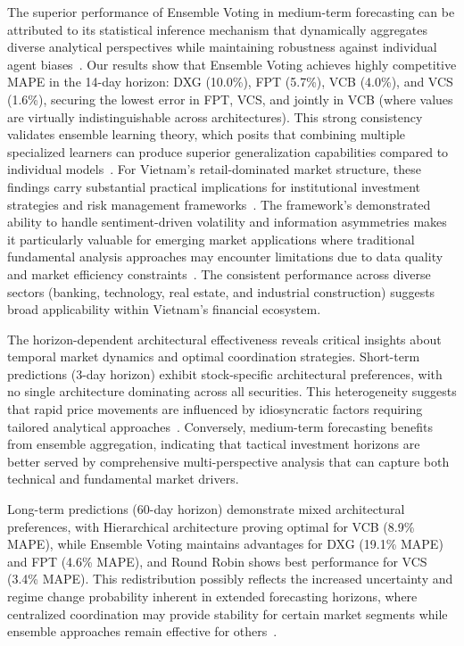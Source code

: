 \documentclass{ieeeaccess}
\begin{document}
The superior performance of Ensemble Voting in medium-term forecasting can be attributed to its statistical inference mechanism that dynamically aggregates diverse analytical perspectives while maintaining robustness against individual agent biases~\cite{zhou2012ensemble,breiman1996bagging}. Our results show that Ensemble Voting achieves highly competitive MAPE in the 14-day horizon: DXG (10.0\%), FPT (5.7\%), VCB (4.0\%), and VCS (1.6\%), securing the lowest error in FPT, VCS, and jointly in VCB (where values are virtually indistinguishable across architectures). This strong consistency validates ensemble learning theory, which posits that combining multiple specialized learners can produce superior generalization capabilities compared to individual models~\cite{dietterich2000ensemble}.
For Vietnam's retail-dominated market structure, these findings carry substantial practical implications for institutional investment strategies and risk management frameworks~\cite{vo2019financial,nguyen2021market}. The framework's demonstrated ability to handle sentiment-driven volatility and information asymmetries makes it particularly valuable for emerging market applications where traditional fundamental analysis approaches may encounter limitations due to data quality and market efficiency constraints~\cite{bekaert2007emerging}. The consistent performance across diverse sectors (banking, technology, real estate, and industrial construction) suggests broad applicability within Vietnam's financial ecosystem.

The horizon-dependent architectural effectiveness reveals critical insights about temporal market dynamics and optimal coordination strategies. Short-term predictions (3-day horizon) exhibit stock-specific architectural preferences, with no single architecture dominating across all securities. This heterogeneity suggests that rapid price movements are influenced by idiosyncratic factors requiring tailored analytical approaches~\cite{campbell1997stock}. Conversely, medium-term forecasting benefits from ensemble aggregation, indicating that tactical investment horizons are better served by comprehensive multi-perspective analysis that can capture both technical and fundamental market drivers.

Long-term predictions (60-day horizon) demonstrate mixed architectural preferences, with Hierarchical architecture proving optimal for VCB (8.9\% MAPE), while Ensemble Voting maintains advantages for DXG (19.1\% MAPE) and FPT (4.6\% MAPE), and Round Robin shows best performance for VCS (3.4\% MAPE). This redistribution possibly reflects the increased uncertainty and regime change probability inherent in extended forecasting horizons, where centralized coordination may provide stability for certain market segments while ensemble approaches remain effective for others~\cite{guidolin2007asset}.
\end{document}
